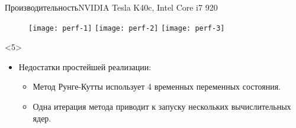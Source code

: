 \documentclass[@BEAMER_OPTIONS@]{beamer}
\begin{document}
\begin{frame}[fragile]{Производительность}{NVIDIA Tesla K40c, Intel Core i7 920}
    \vspace{-0.5\baselineskip}
    \begin{figure}
         {\texttt{[image: perf-1]}}%
         {\texttt{[image: perf-2]}}%
         {\texttt{[image: perf-3]}}%
    \end{figure}
    \vspace{-1\baselineskip}
    \begin{uncoverenv}<5>
        \begin{itemize}
            \item Недостатки простейшей реализации:
                \begin{itemize}
                    \item Метод Рунге-Кутты использует 4 временных переменных
                        состояния.
                    \item Одна итерация метода приводит к запуску нескольких
                        вычислительных ядер.
                \end{itemize}
        \end{itemize}
    \end{uncoverenv}
\end{frame}
\end{document}
